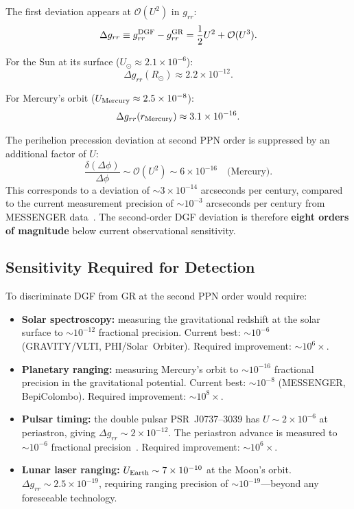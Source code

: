 The first deviation appears at $\mathcal{O}(U^2)$ in $g_{rr}$:
\begin{equation}
\Delta g_{rr} \equiv g_{rr}^{\rm DGF} - g_{rr}^{\rm GR}
= \frac{1}{2}U^2 + \mathcal{O}(U^3).
\label{eq:delta_grr}
\end{equation}

For the Sun at its surface ($U_\odot \approx 2.1\times10^{-6}$):
\begin{equation}
\Delta g_{rr}(R_\odot) \approx 2.2\times10^{-12}.
\end{equation}

For Mercury's orbit ($U_{\rm Mercury}\approx 2.5\times10^{-8}$):
\begin{equation}
\Delta g_{rr}(r_{\rm Mercury}) \approx 3.1\times10^{-16}.
\end{equation}

The perihelion precession deviation at second PPN order is suppressed by an additional factor of $U$:
\begin{equation}
\frac{\delta(\Delta\phi)}{\Delta\phi} \sim \mathcal{O}(U^2) \sim 6\times10^{-16}\quad\text{(Mercury)}.
\end{equation}
This corresponds to a deviation of $\sim 3\times10^{-14}$ arcseconds per century, compared to the current measurement precision of $\sim 10^{-3}$ arcseconds per century from MESSENGER data~\cite{Park:2017}.
The second-order DGF deviation is therefore \textbf{eight orders of magnitude} below current observational sensitivity.

\subsection{Sensitivity Required for Detection}

To discriminate DGF from GR at the second PPN order would require:

\begin{itemize}
    \item \textbf{Solar spectroscopy:} measuring the gravitational redshift at the solar surface to $\sim 10^{-12}$ fractional precision. Current best: $\sim 10^{-6}$ (GRAVITY/VLTI, PHI/Solar~Orbiter). Required improvement: ${\sim}10^{6}\times$.

    \item \textbf{Planetary ranging:} measuring Mercury's orbit to $\sim 10^{-16}$ fractional precision in the gravitational potential. Current best: $\sim 10^{-8}$ (MESSENGER, BepiColombo). Required improvement: ${\sim}10^{8}\times$.

    \item \textbf{Pulsar timing:} the double pulsar PSR~J0737--3039 has $U\sim 2\times10^{-6}$ at periastron, giving $\Delta g_{rr}\sim 2\times10^{-12}$. The periastron advance is measured to $\sim 10^{-6}$ fractional precision~\cite{Kramer:2006}. Required improvement: ${\sim}10^{6}\times$.

    \item \textbf{Lunar laser ranging:} $U_{\rm Earth}\sim 7\times10^{-10}$ at the Moon's orbit. $\Delta g_{rr}\sim 2.5\times10^{-19}$, requiring ranging precision of $\sim 10^{-19}$---beyond any foreseeable technology.
\end{itemize}

